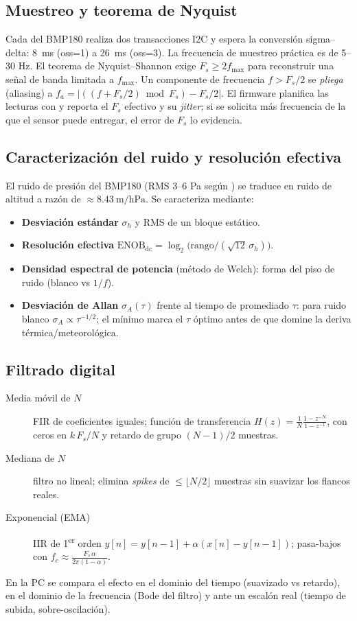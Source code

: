 \documentclass[11pt]{article}
\begin{document}
\subsection{Muestreo y teorema de Nyquist}
Cada  del BMP180 realiza dos transacciones I2C y espera la conversión
sigma--delta: \SI{8}{\milli\second} (oss=1) a \SI{26}{\milli\second} (oss=3). La
frecuencia de muestreo práctica es de 5--30 Hz. El teorema de Nyquist--Shannon exige
$F_s \ge 2 f_\text{max}$ para reconstruir una señal de banda limitada a $f_\text{max}$.
Un componente de frecuencia $f > F_s/2$ se \emph{pliega} (aliasing) a
$f_a = \lvert ((f + F_s/2)\bmod F_s) - F_s/2\rvert$. El firmware planifica las lecturas
con  y reporta el $F_s$ efectivo y su \emph{jitter}; si se solicita más
frecuencia de la que el sensor puede entregar, el error de $F_s$ lo evidencia.

\subsection{Caracterización del ruido y resolución efectiva}
El ruido de presión del BMP180 (RMS 3--6 Pa según ) se traduce en ruido de
altitud a razón de $\approx\SI{8.43}{\meter\per\hecto\pascal}$. Se caracteriza mediante:
\begin{itemize}
  \item \textbf{Desviación estándar} $\sigma_h$ y RMS de un bloque estático.
  \item \textbf{Resolución efectiva} $\text{ENOB}_\text{dc} =
        \log_2\!\bigl(\text{rango}/(\sqrt{12}\,\sigma_h)\bigr)$.
  \item \textbf{Densidad espectral de potencia} (método de Welch): forma del piso de
        ruido (blanco vs $1/f$).
  \item \textbf{Desviación de Allan} $\sigma_A(\tau)$ frente al tiempo de promediado
        $\tau$: para ruido blanco $\sigma_A \propto \tau^{-1/2}$; el mínimo marca el
        $\tau$ óptimo antes de que domine la deriva térmica/meteorológica.
\end{itemize}

\subsection{Filtrado digital}
\begin{description}
  \item[Media móvil de $N$] FIR de coeficientes iguales; función de transferencia
        $H(z) = \frac{1}{N}\frac{1-z^{-N}}{1-z^{-1}}$, con ceros en $k\,F_s/N$ y retardo
        de grupo $(N-1)/2$ muestras.
  \item[Mediana de $N$] filtro no lineal; elimina \emph{spikes} de $\le\lfloor N/2\rfloor$
        muestras sin suavizar los flancos reales.
  \item[Exponencial (EMA)] IIR de 1\textsuperscript{er} orden $y[n]=y[n-1]+\alpha(x[n]-y[n-1])$;
        pasa-bajos con $f_c \approx \frac{F_s\,\alpha}{2\pi(1-\alpha)}$.
\end{description}
En la PC se compara el efecto en el dominio del tiempo (suavizado vs retardo), en el
dominio de la frecuencia (Bode del filtro) y ante un escalón real (tiempo de subida,
sobre-oscilación).
\end{document}
